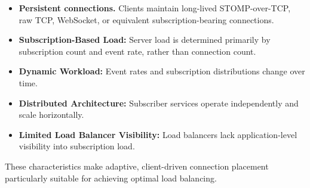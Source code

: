 \begin{itemize}
	
	\item \textbf{Persistent connections.} Clients maintain long-lived STOMP-over-TCP,
	raw TCP, WebSocket, or equivalent subscription-bearing connections.
	
	\item \textbf{Subscription-Based Load:} Server load is determined primarily by subscription count and event rate, rather than connection count.
	
	\item \textbf{Dynamic Workload:} Event rates and subscription distributions change over time.
	
	\item \textbf{Distributed Architecture:} Subscriber services operate independently and scale horizontally.
	
	\item \textbf{Limited Load Balancer Visibility:} Load balancers lack application-level visibility into subscription load.
	
\end{itemize}

These characteristics make adaptive, client-driven connection placement particularly suitable for achieving optimal load balancing.




